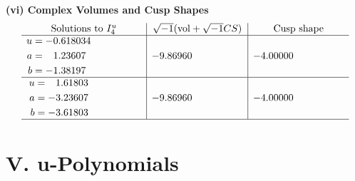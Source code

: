 \documentclass[1p]{elsarticle_modified}
\theoremstyle{definition}
\newcommand{\I}{\sqrt{-1}}
\begin{document}
\newpage\flushleft \textbf{(vi) Complex Volumes and Cusp Shapes}
$$\begin{array}{c|c|c}  
\text{Solutions to }I^u_{4}& \I (\text{vol} + \sqrt{-1}CS) & \text{Cusp shape}\\
 \hline 
\begin{aligned}
u &= -0.618034\phantom{ +0.000000I} \\
a &= \phantom{-}1.23607\phantom{ +0.000000I} \\
b &= -1.38197\phantom{ +0.000000I}\end{aligned}
 & -9.86960\phantom{ +0.000000I} & -4.00000\phantom{ +0.000000I} \\ \hline\begin{aligned}
u &= \phantom{-}1.61803\phantom{ +0.000000I} \\
a &= -3.23607\phantom{ +0.000000I} \\
b &= -3.61803\phantom{ +0.000000I}\end{aligned}
 & -9.86960\phantom{ +0.000000I} & -4.00000\phantom{ +0.000000I}\\
 \hline 
 \end{array}$$\newpage
\newpage\renewcommand{\arraystretch}{1}
\centering \section*{ V. u-Polynomials}
\end{document}
